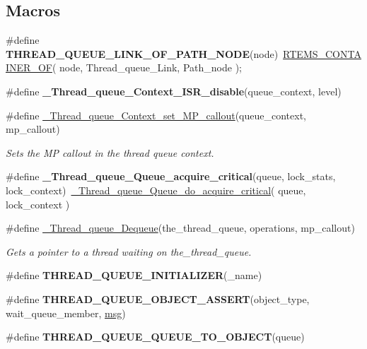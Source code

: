 \subsection*{Macros}
\begin{DoxyCompactItemize}
\item 
\mbox{\label{group__RTEMSScoreThreadQueue_ga754cc407a9c97408595f94d5577a5996}} 
\#define {\bfseries T\+H\+R\+E\+A\+D\+\_\+\+Q\+U\+E\+U\+E\+\_\+\+L\+I\+N\+K\+\_\+\+O\+F\+\_\+\+P\+A\+T\+H\+\_\+\+N\+O\+DE}(node)~\mbox{\hyperlink{group__RTEMSScoreBaseDefs_gab2e7a0141fd898ae358fa9b134aa2610}{R\+T\+E\+M\+S\+\_\+\+C\+O\+N\+T\+A\+I\+N\+E\+R\+\_\+\+OF}}( node, Thread\+\_\+queue\+\_\+\+Link, Path\+\_\+node );
\item 
\#define {\bfseries \+\_\+\+Thread\+\_\+queue\+\_\+\+Context\+\_\+\+I\+S\+R\+\_\+disable}(queue\+\_\+context,  level)
\item 
\#define \mbox{\hyperlink{group__RTEMSScoreThreadQueue_ga18b0ec8fb4243c787a3c5de92fa5d87a}{\+\_\+\+Thread\+\_\+queue\+\_\+\+Context\+\_\+set\+\_\+\+M\+P\+\_\+callout}}(queue\+\_\+context,  mp\+\_\+callout)
\begin{DoxyCompactList}\small\item\em Sets the MP callout in the thread queue context. \end{DoxyCompactList}\item 
\mbox{\label{group__RTEMSScoreThreadQueue_ga7efaa6e5152ffe2478cdc74018c759af}} 
\#define {\bfseries \+\_\+\+Thread\+\_\+queue\+\_\+\+Queue\+\_\+acquire\+\_\+critical}(queue,  lock\+\_\+stats,  lock\+\_\+context)~\mbox{\hyperlink{group__RTEMSScoreThreadQueue_gaca9472b4bf5091cab34d1a4099e4cfa6}{\+\_\+\+Thread\+\_\+queue\+\_\+\+Queue\+\_\+do\+\_\+acquire\+\_\+critical}}( queue, lock\+\_\+context )
\item 
\#define \mbox{\hyperlink{group__RTEMSScoreThreadQueue_ga4e17044b2e16d3d927c52a4d4ecb0ec9}{\+\_\+\+Thread\+\_\+queue\+\_\+\+Dequeue}}(the\+\_\+thread\+\_\+queue,  operations,  mp\+\_\+callout)
\begin{DoxyCompactList}\small\item\em Gets a pointer to a thread waiting on the\+\_\+thread\+\_\+queue. \end{DoxyCompactList}\item 
\#define {\bfseries T\+H\+R\+E\+A\+D\+\_\+\+Q\+U\+E\+U\+E\+\_\+\+I\+N\+I\+T\+I\+A\+L\+I\+Z\+ER}(\+\_\+name)
\item 
\#define {\bfseries T\+H\+R\+E\+A\+D\+\_\+\+Q\+U\+E\+U\+E\+\_\+\+O\+B\+J\+E\+C\+T\+\_\+\+A\+S\+S\+E\+RT}(object\+\_\+type,  wait\+\_\+queue\+\_\+member,  \mbox{\hyperlink{structmsg}{msg}})
\item 
\#define {\bfseries T\+H\+R\+E\+A\+D\+\_\+\+Q\+U\+E\+U\+E\+\_\+\+Q\+U\+E\+U\+E\+\_\+\+T\+O\+\_\+\+O\+B\+J\+E\+CT}(queue)
\end{DoxyCompactItemize}
